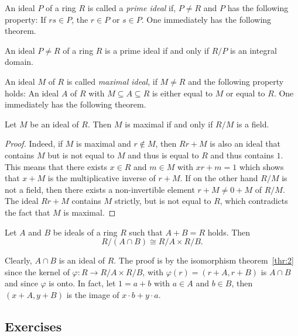 An ideal $P$ of a ring $R$ is called a \emph{prime ideal} if, $P ≠R$ and $P$ has the following property: If $rs ∈P$, the $r ∈P$ or $s ∈P$. One immediately has the following theorem. 

\begin{theorem}
  \label{thr:3}
  An ideal $P ≠R$ of a ring $R$ is a prime ideal if and only if $R/P$ is an integral domain. 
\end{theorem}

An ideal $M$ of $R$ is called \emph{maximal ideal}, if $M ≠R$ and the following property holds: An ideal $A$ of $R$ with $M ⊆ A ⊆R$ is either equal to $M$ or equal to $R$. One immediately has the following theorem.

\begin{theorem}
  \label{thr:4}
  Let $M$ be an ideal of $R$. Then $M$ is maximal if and only if $R/M$ is a field. 
\end{theorem}
\begin{proof}
  \small Indeed, if $M$ is maximal and $r ∉ M$, then $Rr + M$ is also an ideal that contains $M$ but is not equal to $M$ and thus is equal to $R$ and thus contains $1$. This means that there exists $x ∈R$ and $m ∈M$ with $xr + m =1$ which shows that $x+M$ is the multiplicative inverse of $r+M$. If on the other hand $R/M$ is not a field, then there exists a non-invertible element $r + M ≠ 0+M$ of $R/M$. The ideal $Rr + M$ contains $M$ strictly, but is not equal to $R$, which contradicts the fact that $M$ is maximal. 
\end{proof}


\begin{theorem} 
  \label{thr:8}
  Let $A$ and $B$ be ideals of a ring $R$ such that $A+B = R$ holds. Then
  \begin{displaymath}
    R/(A ∩B) ≅ R/A × R/B. 
  \end{displaymath}    
\end{theorem}
{ \small \noindent Clearly, $A∩B$ is an ideal of $R$. 
The proof is by the isomorphism theorem~\ref{thr:2} since the kernel of $φ: R →  R/A × R/B$, with $φ(r) = (r+A, r+B)$ is $A ∩B$ and since $φ$ is onto. In fact, let $1 = a+b$ with $a ∈A$ and $b∈B$, then $(x+A,y+B)$ is the image of $x⋅b + y⋅a$. 
}
\subsection*{Exercises}


